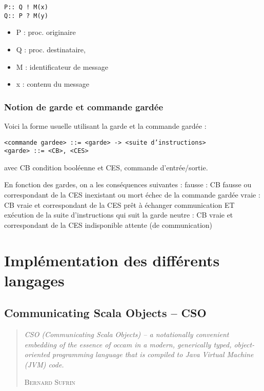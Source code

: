\documentclass[a4paper,11pt,french]{report}
\begin{document}
\begin{lstlisting}[frame=trBL]
P:: Q ! M(x)
Q:: P ? M(y)
\end{lstlisting}
 \begin{itemize}
 \item P : proc. originaire
 \item Q : proc. destinataire,
 \item M : identificateur de message
 \item x : contenu du message
 \end{itemize}
 
 \section{Notion de garde et commande gardée}
 Voici la forme usuelle utilisant la garde et la commande gardée :
 
 \begin{lstlisting}[frame=trBL]
<commande gardee> ::= <garde> -> <suite d’instructions>
<garde> ::= <CB>, <CES>
\end{lstlisting}

avec CB condition booléenne et CES, commande d'entrée/sortie.

En fonction des gardes, on a les conséquences suivantes :
fausse : CB fausse ou correspondant de la CES inexistant ou
mort
échec de la commande gardée
vraie : CB vraie et correspondant de la CES prêt à échanger
communication ET exécution de la suite d’instructions qui suit
la garde
neutre : CB vraie et correspondant de la CES indisponible
attente (de communication)



\part{Implémentation des différents langages}
\chapter[CSO]{Communicating Scala Objects -- CSO}
\begin{quotation}
\textit{\og CSO (Communicating Scala Objects) – a notationally convenient embedding of the essence of occam in a modern, generically typed, object-oriented programming language that is compiled to Java Virtual Machine (JVM) code.\fg}
\begin{flushright}
\textsc{Bernard Sufrin}
\end{flushright}
\end{quotation}
\bigskip
\end{document}
